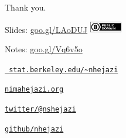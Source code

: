 \documentclass[12pt,t]{beamer}
\begin{document}
\begin{frame}[c]{Thank you.}

\Large
Slides: \href{https://goo.gl/LAoDUJ}{goo.gl/LAoDUJ} \quad
\includegraphics[height=5mm]{Figs/cc-zero.png}

\vspace{3mm}
Notes: \href{https://goo.gl/Vq6v5o}{goo.gl/Vq6v5o}


\vspace{3mm}
\href{https://www.stat.berkeley.edu/~nhejazi}{\tt
  stat.berkeley.edu/\textasciitilde{}nhejazi}

\vspace{3mm}
\href{https://nimahejazi.org}{\tt nimahejazi.org}

\vspace{3mm}
\href{https://twitter.com/nshejazi}{\tt twitter/@nshejazi}

\vspace{3mm}
\href{https://github.com/nhejazi}{\tt github/nhejazi}


\end{frame}

\end{document}
